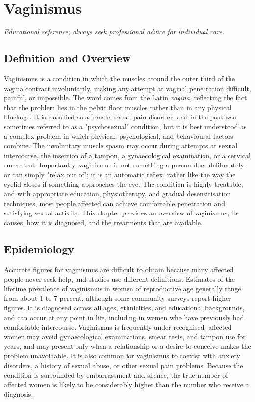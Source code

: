 \chapter{Vaginismus}

\medskip
\noindent\textit{Educational reference; always seek professional advice for individual care.}

\section*{Definition and Overview}
Vaginismus is a condition in which the muscles around the outer third of the vagina contract involuntarily, making any attempt at vaginal penetration difficult, painful, or impossible. The word comes from the Latin \textit{vagina}, reflecting the fact that the problem lies in the pelvic floor muscles rather than in any physical blockage. It is classified as a female sexual pain disorder, and in the past was sometimes referred to as a "psychosexual" condition, but it is best understood as a complex problem in which physical, psychological, and behavioural factors combine. The involuntary muscle spasm may occur during attempts at sexual intercourse, the insertion of a tampon, a gynaecological examination, or a cervical smear test. Importantly, vaginismus is not something a person does deliberately or can simply "relax out of"; it is an automatic reflex, rather like the way the eyelid closes if something approaches the eye. The condition is highly treatable, and with appropriate education, physiotherapy, and gradual desensitisation techniques, most people affected can achieve comfortable penetration and satisfying sexual activity. This chapter provides an overview of vaginismus, its causes, how it is diagnosed, and the treatments that are available.

\section*{Epidemiology}
Accurate figures for vaginismus are difficult to obtain because many affected people never seek help, and studies use different definitions. Estimates of the lifetime prevalence of vaginismus in women of reproductive age generally range from about 1 to 7 percent, although some community surveys report higher figures. It is diagnosed across all ages, ethnicities, and educational backgrounds, and can occur at any point in life, including in women who have previously had comfortable intercourse. Vaginismus is frequently under-recognised: affected women may avoid gynaecological examinations, smear tests, and tampon use for years, and may present only when a relationship or a desire to conceive makes the problem unavoidable. It is also common for vaginismus to coexist with anxiety disorders, a history of sexual abuse, or other sexual pain problems. Because the condition is surrounded by embarrassment and silence, the true number of affected women is likely to be considerably higher than the number who receive a diagnosis.

